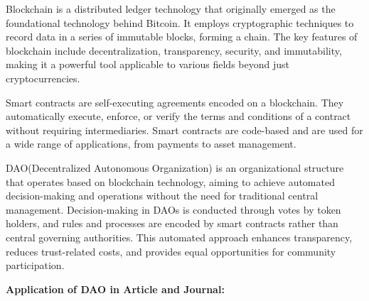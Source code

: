 \documentclass[lettersize,journal]{IEEEtran}
\begin{document}
Blockchain is a distributed ledger technology that originally emerged as the foundational technology behind Bitcoin. It employs cryptographic techniques to record data in a series of immutable blocks, forming a chain. The key features of blockchain include decentralization, transparency, security, and immutability, making it a powerful tool applicable to various fields beyond just cryptocurrencies.

Smart contracts are self-executing agreements encoded on a blockchain. They automatically execute, enforce, or verify the terms and conditions of a contract without requiring intermediaries. Smart contracts are code-based and are used for a wide range of applications, from payments to asset management.

DAO(Decentralized Autonomous Organization) is an organizational structure that operates based on blockchain technology, aiming to achieve automated decision-making and operations without the need for traditional central management. Decision-making in DAOs is conducted through votes by token holders, and rules and processes are encoded by smart contracts rather than central governing authorities. This automated approach enhances transparency, reduces trust-related costs, and provides equal opportunities for community participation\cite{wang2019decentralized}. 


\textbf{Application of DAO in Article and Journal:}
\end{document}
